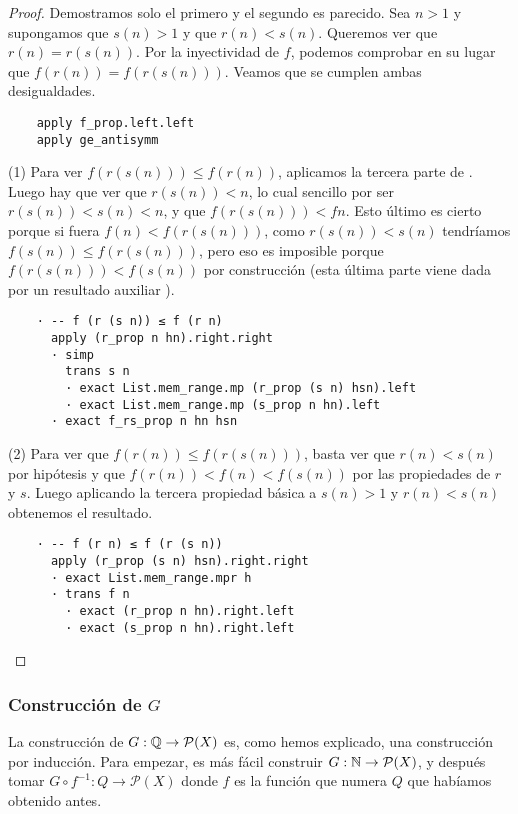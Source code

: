 \begin{proof}
  Demostramos solo el primero y el segundo es parecido. Sea $n > 1$ y supongamos que $s(n) > 1$ y que $r(n) < s(n)$. Queremos ver que $r(n) = r(s(n))$. Por la inyectividad de $f$, podemos comprobar en su lugar que $ f (r (n)) = f (r (s (n)))$. Veamos que se cumplen ambas desigualdades.

  \begin{lstlisting}
    apply f_prop.left.left
    apply ge_antisymm \end{lstlisting}

  (1) Para ver $f (r (s (n))) \leq f (r (n))$, aplicamos la tercera parte de . Luego hay que ver que $r(s(n)) < n$, lo cual sencillo por ser $r(s(n)) < s(n) < n$, y que $f (r (s (n))) < f n$. Esto último es cierto porque si fuera $f(n) < f(r(s(n)))$, como $r(s(n)) < s(n)$ tendríamos $f(s (n)) \leq f(r(s(n)))$, pero eso es imposible porque $f(r(s(n))) < f(s(n))$ por construcción (esta última parte viene dada por un resultado auxiliar ).

  \begin{lstlisting}
    · -- f (r (s n)) ≤ f (r n)
      apply (r_prop n hn).right.right
      · simp
        trans s n
        · exact List.mem_range.mp (r_prop (s n) hsn).left
        · exact List.mem_range.mp (s_prop n hn).left
      · exact f_rs_prop n hn hsn \end{lstlisting}

  (2) Para ver que $f (r (n)) \leq f (r (s (n)))$, basta ver que $r(n) < s(n)$ por hipótesis y que $f(r(n)) < f(n) < f(s(n))$ por las propiedades de $r$ y $s$. Luego aplicando la tercera propiedad básica a $s(n) > 1$ y $r(n) < s(n)$ obtenemos el resultado.

  \begin{lstlisting}
    · -- f (r n) ≤ f (r (s n))
      apply (r_prop (s n) hsn).right.right
      · exact List.mem_range.mpr h
      · trans f n
        · exact (r_prop n hn).right.left
        · exact (s_prop n hn).right.left \end{lstlisting}
\end{proof}

\subsubsection{Construcción de $G$} 

La construcción de $G : \mathbb{Q} \to \mathcal{P}(X)$ es, como hemos explicado, una construcción por inducción. Para empezar, es más fácil construir $G : \mathbb{N} \to \mathcal{P}(X)$, y después tomar $G \circ f^{-1} : Q \to \mathcal{P}(X)$ donde $f$ es la función que numera $Q$ que habíamos obtenido antes.

